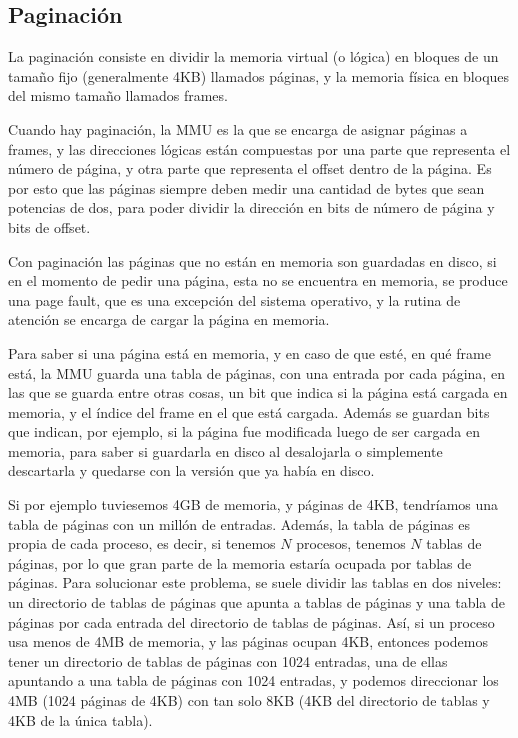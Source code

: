 \documentclass{article}
\begin{document}
\subsection{Paginaci\'on}

La paginaci\'on consiste en dividir la memoria virtual (o l\'ogica) en bloques de un tama\~no fijo (generalmente 4KB) llamados p\'aginas, y la memoria f\'isica en bloques del mismo tama\~no llamados frames.

Cuando hay paginaci\'on, la MMU es la que se encarga de asignar p\'aginas a frames, y las direcciones l\'ogicas est\'an compuestas por una parte que representa el n\'umero de p\'agina, y otra parte que representa el offset dentro de la p\'agina. Es por esto que las p\'aginas siempre deben medir una cantidad de bytes que sean potencias de dos, para poder dividir la direcci\'on en bits de n\'umero de p\'agina y bits de offset.

Con paginaci\'on las p\'aginas que no est\'an en memoria son guardadas en disco, si en el momento de pedir una p\'agina, esta no se encuentra en memoria, se produce una page fault, que es una excepci\'on del sistema operativo, y la rutina de atenci\'on se encarga de cargar la p\'agina en memoria.

Para saber si una p\'agina est\'a en memoria, y en caso de que est\'e, en qu\'e frame est\'a, la MMU guarda una tabla de p\'aginas, con una entrada por cada p\'agina, en las que se guarda entre otras cosas, un bit que indica si la p\'agina est\'a cargada en memoria, y el \'indice del frame en el que est\'a cargada. Adem\'as se guardan bits que indican, por ejemplo, si la p\'agina fue modificada luego de ser cargada en memoria, para saber si guardarla en disco al desalojarla o simplemente descartarla y quedarse con la versi\'on que ya hab\'ia en disco.

Si por ejemplo tuviesemos 4GB de memoria, y p\'aginas de 4KB, tendr\'iamos una tabla de p\'aginas con un mill\'on de entradas. Adem\'as, la tabla de p\'aginas es propia de cada proceso, es decir, si tenemos $N$ procesos, tenemos $N$ tablas de p\'aginas, por lo que gran parte de la memoria estar\'ia ocupada por tablas de p\'aginas. Para solucionar este problema, se suele dividir las tablas en dos niveles: un directorio de tablas de p\'aginas que apunta a tablas de p\'aginas y una tabla de p\'aginas por cada entrada del directorio de tablas de p\'aginas. As\'i, si un proceso usa menos de 4MB de memoria, y las p\'aginas ocupan 4KB, entonces podemos tener un directorio de tablas de p\'aginas con 1024 entradas, una de ellas apuntando a una tabla de p\'aginas con 1024 entradas, y podemos direccionar los 4MB (1024 p\'aginas de 4KB) con tan solo 8KB (4KB del directorio de tablas y 4KB de la \'unica tabla).
\end{document}
